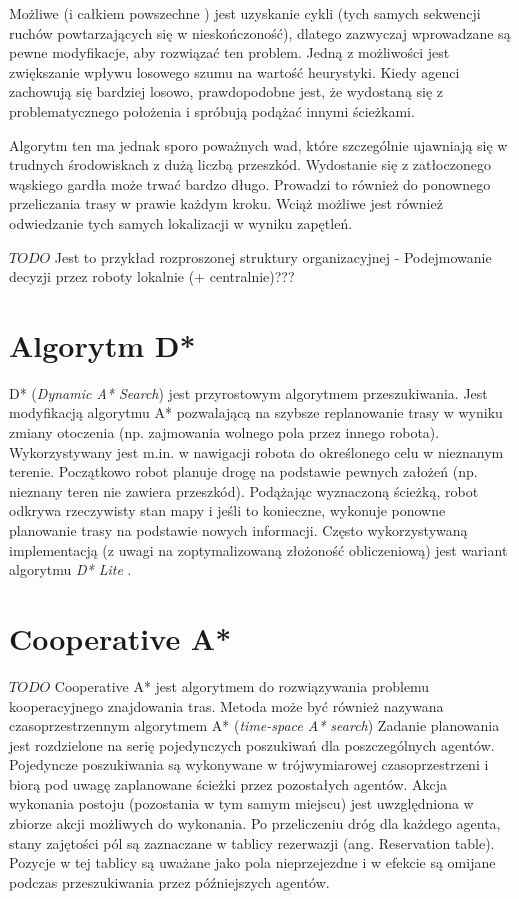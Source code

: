 Możliwe (i całkiem powszechne \cite{cooppath}) jest uzyskanie cykli (tych samych sekwencji ruchów powtarzających się w nieskończoność), dlatego zazwyczaj wprowadzane są pewne modyfikacje, aby rozwiązać ten problem. Jedną z możliwości jest zwiększanie wpływu losowego szumu na wartość heurystyki. Kiedy agenci zachowują się bardziej losowo, prawdopodobne jest, że wydostaną się z problematycznego położenia i spróbują podążać innymi ścieżkami.

Algorytm ten ma jednak sporo poważnych wad, które szczególnie ujawniają się w trudnych środowiskach z dużą liczbą przeszkód. Wydostanie się z zatłoczonego wąskiego gardła może trwać bardzo długo. Prowadzi to również do ponownego przeliczania trasy w prawie każdym kroku. Wciąż możliwe jest również odwiedzanie tych samych lokalizacji w wyniku zapętleń.

$TODO$ Jest to przykład rozproszonej struktury organizacyjnej - Podejmowanie decyzji przez roboty lokalnie (+ centralnie)???

\section{Algorytm D*}
D* ({\it Dynamic A* Search}) jest przyrostowym algorytmem przeszukiwania. Jest modyfikacją algorytmu A* pozwalającą na szybsze replanowanie trasy w wyniku zmiany otoczenia (np. zajmowania wolnego pola przez innego robota). Wykorzystywany jest m.in. w nawigacji robota do określonego celu w nieznanym terenie. Początkowo robot planuje drogę na podstawie pewnych założeń (np. nieznany teren nie zawiera przeszkód). Podążając wyznaczoną ścieżką, robot odkrywa rzeczywisty stan mapy i jeśli to konieczne, wykonuje ponowne planowanie trasy na podstawie nowych informacji.
Często wykorzystywaną implementacją (z uwagi na zoptymalizowaną złożoność obliczeniową) jest wariant algorytmu {\it D* Lite} \cite{dstarlite}.

\section{Cooperative A*}
$TODO$
Cooperative A* jest algorytmem do rozwiązywania problemu kooperacyjnego znajdowania tras.
Metoda może być również nazywana czasoprzestrzennym algorytmem A* ({\it time-space A* search})
Zadanie planowania jest rozdzielone na serię pojedynczych poszukiwań dla poszczególnych agentów.
Pojedyncze poszukiwania są wykonywane w trójwymiarowej czasoprzestrzeni i biorą pod uwagę zaplanowane ścieżki przez pozostałych agentów.
Akcja wykonania postoju (pozostania w tym samym miejscu) jest uwzględniona w zbiorze akcji możliwych do wykonania.
Po przeliczeniu dróg dla każdego agenta, stany zajętości pól są zaznaczane w tablicy rezerwazji (ang. Reservation table).
Pozycje w tej tablicy są uważane jako pola nieprzejezdne i w efekcie są omijane podczas przeszukiwania przez późniejszych agentów. \cite{cooppath}

